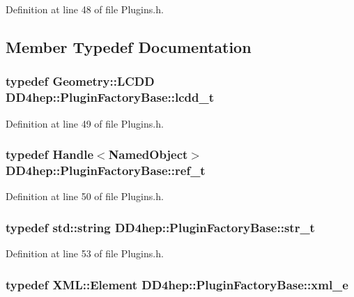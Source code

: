 Definition at line 48 of file Plugins.h.

\subsection{Member Typedef Documentation}
\hypertarget{struct_d_d4hep_1_1_plugin_factory_base_a61b840cc18cdd24ae2e383da306b9c9a}{
\subsubsection[{lcdd\_\-t}]{\setlength{\rightskip}{0pt plus 5cm}typedef {\bf Geometry::LCDD} {\bf DD4hep::PluginFactoryBase::lcdd\_\-t}}}
\label{struct_d_d4hep_1_1_plugin_factory_base_a61b840cc18cdd24ae2e383da306b9c9a}


Definition at line 49 of file Plugins.h.\hypertarget{struct_d_d4hep_1_1_plugin_factory_base_ab13458952a5b4a91f5130d3ee4db4d33}{
\subsubsection[{ref\_\-t}]{\setlength{\rightskip}{0pt plus 5cm}typedef {\bf Handle}$<${\bf NamedObject}$>$ {\bf DD4hep::PluginFactoryBase::ref\_\-t}}}
\label{struct_d_d4hep_1_1_plugin_factory_base_ab13458952a5b4a91f5130d3ee4db4d33}


Definition at line 50 of file Plugins.h.\hypertarget{struct_d_d4hep_1_1_plugin_factory_base_aaa4c6d8801f70db2776c5473abc92692}{
\subsubsection[{str\_\-t}]{\setlength{\rightskip}{0pt plus 5cm}typedef std::string {\bf DD4hep::PluginFactoryBase::str\_\-t}}}
\label{struct_d_d4hep_1_1_plugin_factory_base_aaa4c6d8801f70db2776c5473abc92692}


Definition at line 53 of file Plugins.h.\hypertarget{struct_d_d4hep_1_1_plugin_factory_base_a4fd06e29fc55de37e856b2a72831d50e}{
\subsubsection[{xml\_\-e}]{\setlength{\rightskip}{0pt plus 5cm}typedef {\bf XML::Element} {\bf DD4hep::PluginFactoryBase::xml\_\-e}}}
\label{struct_d_d4hep_1_1_plugin_factory_base_a4fd06e29fc55de37e856b2a72831d50e}


